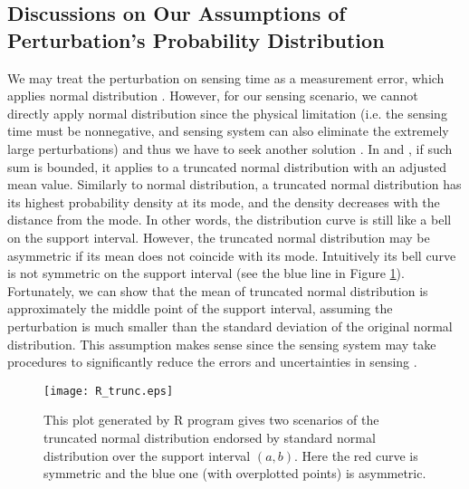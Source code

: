 \documentclass{IEEEtran}
\begin{document}
\subsection{Discussions on Our Assumptions of Perturbation's Probability Distribution}
\label{sec:dis_assume}
We may treat the perturbation on sensing time as a measurement error, which applies normal distribution \cite{wmb}. However, for our sensing scenario, we cannot directly apply normal distribution since the physical limitation (i.e. the sensing time must be nonnegative, and sensing system can also eliminate the extremely large perturbations) and thus we have to seek another solution \cite{burkardt2014truncated}. In \cite{burkardt2014truncated} and \cite{damien2001sampling}, if such sum is bounded, it applies to a truncated normal distribution with an adjusted mean value. Similarly to normal distribution, a truncated normal distribution has its highest probability density at its mode, and the density decreases with the distance from the mode. In other words, the distribution curve is still like a bell on the support interval. However, the truncated normal distribution may be asymmetric if its mean does not coincide with its mode. Intuitively its bell curve is not symmetric on the support interval (see the blue line in Figure \ref{fig:R_trunc}). Fortunately, we can show that the mean of truncated normal distribution is approximately the middle point of the support interval, assuming the perturbation is much smaller than the standard deviation of the original normal distribution. This assumption makes sense since the sensing system may take procedures to significantly reduce the errors and uncertainties in sensing \cite{cochran1968errors}.
\begin{figure}[!t]
\centering
\texttt{[image: R\_trunc.eps]}
\caption{This plot generated by R program gives two scenarios of the truncated normal distribution endorsed by standard normal distribution over the support interval $(a,b)$. Here the red curve is symmetric and the blue one (with overplotted points) is asymmetric.}
\label{fig:R_trunc}
\end{figure}
\end{document}
